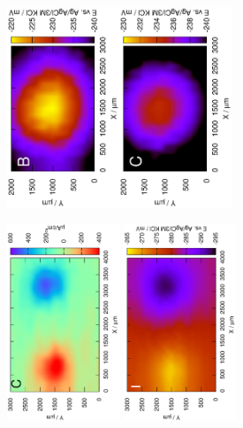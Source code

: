 \begin{figure}
\includegraphics[width=0.3\textwidth, angle=-90]{img/mérések/Zn_h_100.eps}\includegraphics[width=0.3\textwidth, angle=-90]{img/mérések/Zn_h_500.eps}

\includegraphics[width=0.3\textwidth, angle=-90]{img/mérések/grafit_h_100.eps}
\includegraphics[width=0.3\textwidth, angle=-90]{img/mérések/grafit_h_300.eps}


\end{figure}
